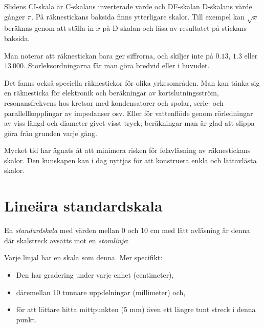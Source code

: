 \documentclass[oneside,11pt,a4paper,swedish]{scrbook}
\begin{document}
Slidens CI-skala är C-skalans inverterade värde och  DF-skalan D-skalans värde gånger $\pi$. På räknestickans baksida finns ytterligare skalor. Till exempel kan $\sqrt{x}$ beräknas genom att ställa in $x$ på D-skalan och läsa av resultatet på stickans baksida.

Man noterar att räknestickan bara ger siffrorna, och skiljer inte på $0.13$, $1.3$ eller $13~000$. Storleksordningarna får man göra bredvid eller i huvudet.

Det fanns också speciella räknestickor för olika yrkesområden. Man kan tänka sig en räknesticka för elektronik och beräkningar av kortslutningsström, resonansfrekvens hos kretsar med kondensatorer och spolar, serie- och parallellkopplingar av impedanser osv. Eller för vattenflöde genom rörledningar av viss längd och diameter givet visst tryck; beräkningar man är glad att slippa göra från grunden varje gång.

Mycket tid har ägnats åt att minimera risken för felavläsning av räknestickans skalor. Den kunskapen kan i dag nyttjas för att konstruera enkla och lättavlästa skalor.

\section{Lineära standardskala}

En \emph{standardskala} med värden mellan 0 och 10 cm med lätt avläsning är denna där skalstreck avsätts mot en \emph{stomlinje}:

\begin{center}
\end{center}

Varje linjal har en skala som denna. Mer specifikt:

\begin{itemize}
\item Den har gradering under varje enhet (centimeter), 
\item däremellan 10 tunnare uppdelningar (millimeter) och, 
\item för att lättare hitta mittpunkten (5 mm) även ett längre tunt streck i denna punkt. 
\end{itemize}
\end{document}
